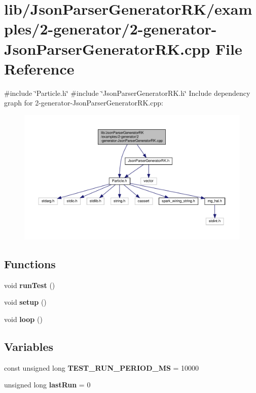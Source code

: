 \section{lib/\+Json\+Parser\+Generator\+R\+K/examples/2-\/generator/2-\/generator-\/\+Json\+Parser\+Generator\+RK.cpp File Reference}
\label{2-generator-_json_parser_generator_r_k_8cpp}
{\ttfamily \#include \char`\"{}Particle.\+h\char`\"{}}\newline
{\ttfamily \#include \char`\"{}Json\+Parser\+Generator\+R\+K.\+h\char`\"{}}\newline
Include dependency graph for 2-\/generator-\/\+Json\+Parser\+Generator\+RK.cpp\+:\nopagebreak
\begin{figure}[H]
\begin{center}
\leavevmode
\includegraphics[width=350pt]{2-generator-_json_parser_generator_r_k_8cpp__incl}
\end{center}
\end{figure}
\subsection*{Functions}
\begin{DoxyCompactItemize}
\item 
void \textbf{ run\+Test} ()
\item 
void \textbf{ setup} ()
\item 
void \textbf{ loop} ()
\end{DoxyCompactItemize}
\subsection*{Variables}
\begin{DoxyCompactItemize}
\item 
const unsigned long \textbf{ T\+E\+S\+T\+\_\+\+R\+U\+N\+\_\+\+P\+E\+R\+I\+O\+D\+\_\+\+MS} = 10000
\item 
unsigned long \textbf{ last\+Run} = 0
\end{DoxyCompactItemize}


